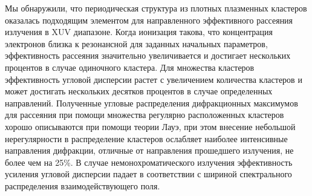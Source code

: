 Мы обнаружили, что периодическая структура из плотных плазменных кластеров оказалась подходящим элементом для направленного эффективного рассеяния излучения в XUV диапазоне. Когда ионизация такова, что концентрация электронов близка к резонансной для заданных начальных параметров, эффективность рассеяния значительно увеличивается и достигает нескольких процентов в случае одиночного кластера. Для множества кластеров эффективность угловой дисперсии растет с увеличением количества кластеров и может достигать нескольких десятков процентов в случае определенных направлений. Полученные угловые распределения дифракционных максимумов для рассеяния при помощи множества регулярно расположенных кластеров хорошо описываются при помощи теории Лауэ, при этом внесение небольшой нерегулярности в распределение кластеров ослабляет наиболее интенсивные направления дифракции, отличные от направления прошедшего излучения, не более чем на 25\%. В случае немонохроматического излучения эффективность усиления угловой дисперсии падает в соответствии с шириной спектрального распределения взаимодействующего поля.